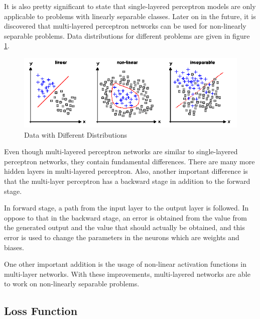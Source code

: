 It is also pretty significant to state that single-layered perceptron models are only applicable to problems with linearly separable classes. Later on in the future, it is discovered that multi-layered perceptron networks can be used for non-linearly separable problems. Data distributions for different problems are given in figure \ref{fig:data-diff-dist}.

\begin{figure}[h!]
    \centering
    \includegraphics{figures/chapter3/linear-nonlinear-seperable.png}
    \caption{Data with Different Distributions\cite{sepdata}}
    \label{fig:data-diff-dist}
\end{figure}

Even though multi-layered perceptron networks are similar to single-layered perceptron networks, they contain fundamental differences. There are many more hidden layers in multi-layered perceptron. Also, another important difference is that the multi-layer perceptron has a backward stage in addition to the forward stage.

In forward stage, a path from the input layer to the output layer is followed. In oppose to that in the backward stage, an error is obtained from the value from the generated output and the value that should actually be obtained, and this error is used to change the parameters in the neurons which are weights and biases.

One other important addition is the usage of non-linear activation functions in multi-layer networks. With these improvements, multi-layered networks are able to work on non-linearly separable problems.

\subsection{Loss Function}

